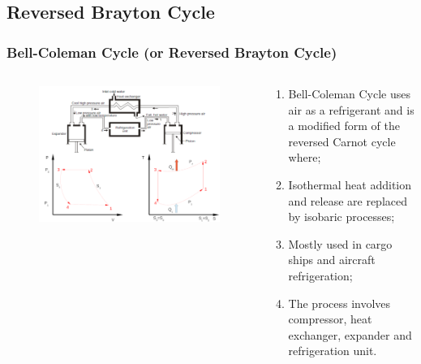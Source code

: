 \documentclass[10pt,compress]{beamer}
\begin{document}
\subsection{Reversed Brayton Cycle}

\begin{frame}
 \frametitle{Bell-Coleman Cycle (or Reversed Brayton Cycle)}
    \begin{columns}
       \begin{column}[c]{0.55\linewidth}
          \begin{figure}%
            \begin{center}
               \includegraphics[width=\columnwidth]{./Pics/Overview_Refrig6}
            \end{center}
          \end{figure}  
       \end{column}
       \begin{column}[c]{0.45\linewidth}
         \begin{enumerate}[(1)]\scriptsize
           \item <1-> Bell-Coleman Cycle uses air as a refrigerant and is a modified form of the reversed Carnot cycle where;
           \item <1-> Isothermal heat addition and release are replaced by isobaric processes;   
           \item <2-> Mostly used in cargo ships and aircraft refrigeration;
           \item <3-> The process involves compressor, heat exchanger, expander and refrigeration unit.
         \end{enumerate}
      \end{column}
   \end{columns} 
\end{frame}
\end{document}
